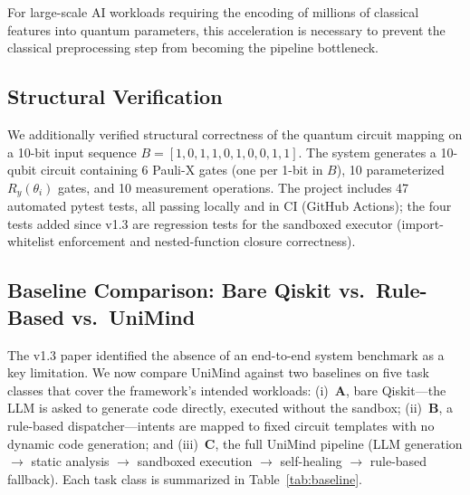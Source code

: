﻿\documentclass[12pt,a4paper]{article}
\begin{document}
For large-scale AI workloads requiring the encoding of millions of classical features into quantum parameters, this acceleration is necessary to prevent the classical preprocessing step from becoming the pipeline bottleneck.

\subsection{Structural Verification}\label{sec:structural}

We additionally verified structural correctness of the quantum circuit mapping on a 10-bit input sequence $B = [1, 0, 1, 1, 0, 1, 0, 0, 1, 1]$. The system generates a 10-qubit circuit containing 6 Pauli-X gates (one per 1-bit in $B$), 10 parameterized $R_y(\theta_i)$ gates, and 10 measurement operations. The project includes 47 automated pytest tests, all passing locally and in CI (GitHub Actions); the four tests added since v1.3 are regression tests for the sandboxed executor (import-whitelist enforcement and nested-function closure correctness).

\subsection{Baseline Comparison: Bare Qiskit vs.\ Rule-Based vs.\ UniMind}\label{sec:baseline}

The v1.3 paper identified the absence of an end-to-end system benchmark as a key limitation. We now compare UniMind against two baselines on five task classes that cover the framework's intended workloads: (i)~\textbf{A}, bare Qiskit---the LLM is asked to generate code directly, executed without the sandbox; (ii)~\textbf{B}, a rule-based dispatcher---intents are mapped to fixed circuit templates with no dynamic code generation; and (iii)~\textbf{C}, the full UniMind pipeline (LLM generation $\rightarrow$ static analysis $\rightarrow$ sandboxed execution $\rightarrow$ self-healing $\rightarrow$ rule-based fallback). Each task class is summarized in Table~\ref{tab:baseline}.
\end{document}
